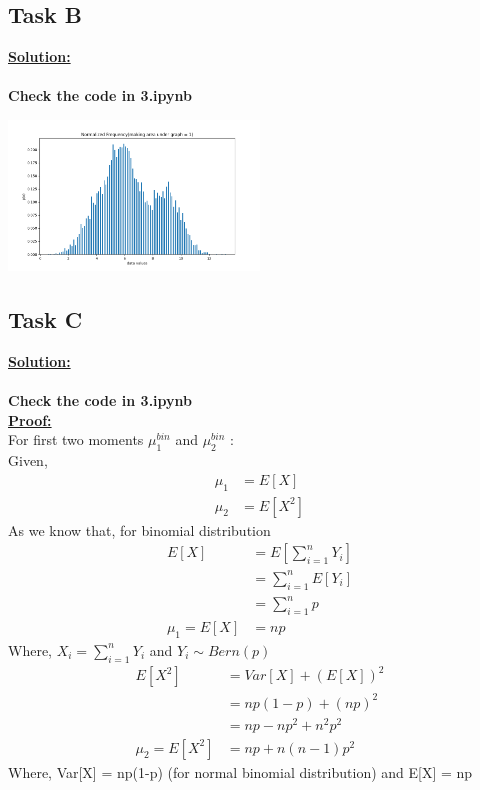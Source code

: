 \documentclass[12pt]{article}
\begin{document}
\subsection{Task B}
\textbf{\underline{Solution:}}\\
\\
\textbf{Check the code in 3.ipynb}
\begin{minipage}{\linewidth}
    \begin{center}
        \includegraphics[width=0.5\textwidth]{images/3b.png}
    \end{center}
\end{minipage}
\subsection{Task C}
\textbf{\underline{Solution:}}\\
\\
\textbf{Check the code in 3.ipynb}
\\
\textbf{\underline{Proof: }}
\\
For first two moments $\mu_1^{bin}$ and $\mu_2^{bin}$ :
\\
Given,
\begin{equation}
\begin{split}
    \mu_1 &= E[X] \\
    \mu_2 &= E[X^2]
\end{split}
\end{equation}
As we know that, for binomial distribution
\begin{equation}
\begin{split}
     E[X] &= E[\sum_{i=1}^{n}Y_i]\\
          &= \sum_{i=1}^{n}E[Y_i]\\
          &= \sum_{i=1}^{n}p\\
     \mu_1 = E[X] &= np
\end{split}
\end{equation}
Where, $X_i = \sum_{i=1}^{n}Y_i$ and $Y_i \sim Bern(p)$
\begin{equation}
\begin{split}
     E[X^2] &= Var[X] + (E[X])^2\\
          &= np(1-p) + (np)^2\\
          &= np - n{p}^2 + n^2p^2\\
     \mu_2 = E[X^2] &= np + n(n-1)p^2
\end{split}
\end{equation}
Where, Var[X] = np(1-p) (for normal binomial distribution) and E[X] = np
\end{document}
